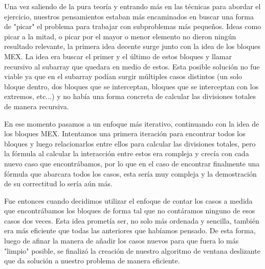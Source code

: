 \documentclass{article}
\begin{document}
Una vez saliendo de la pura teoría y entrando más en las técnicas para abordar el ejercicio, nuestros pensamientos estaban más encaminados en buscar una forma de "picar" el problema para trabajar con subproblemas más pequeños. Ideas como picar a la mitad, o picar por el mayor o menor elemento no dieron ningún resultado relevante, la primera idea decente surge junto con la idea de los bloques MEX. La idea era buscar el primer y el último de estos bloques y llamar recursivo al subarray que quedara en medio de estos. Esta posible solución no fue viable ya que en el subarray podían surgir múltiples casos distintos (un solo bloque dentro, dos bloques que se interceptan, bloques que se interceptan con los extremos, etc...) y no había una forma concreta de calcular las divisiones totales de manera recursiva.

En ese momento pasamos a un enfoque más iterativo, continuando con la idea de los bloques MEX. Intentamos una primera iteración para encontrar todos los bloques y luego relacionarlos entre ellos para calcular las divisiones totales, pero la fórmula al calcular la interacción entre estos era compleja y crecía con cada nuevo caso que encontrábamos, por lo que en el caso de encontrar finalmente una fórmula que abarcara todos los casos, esta sería muy compleja y la demostración de su correctitud lo sería aún más.

Fue entonces cuando decidimos utilizar el enfoque de contar los casos a medida que encontrábamos los bloques de forma tal que no contáramos ninguno de esos casos dos veces. Esta idea prometía ser, no solo más ordenada y sencilla, también era más eficiente que todas las anteriores que habíamos pensado. De esta forma, luego de afinar la manera de añadir los casos nuevos para que fuera lo más "limpio" posible, se finalizó la creación de nuestro algoritmo de ventana deslizante que da solución a nuestro problema de manera eficiente.
\end{document}

